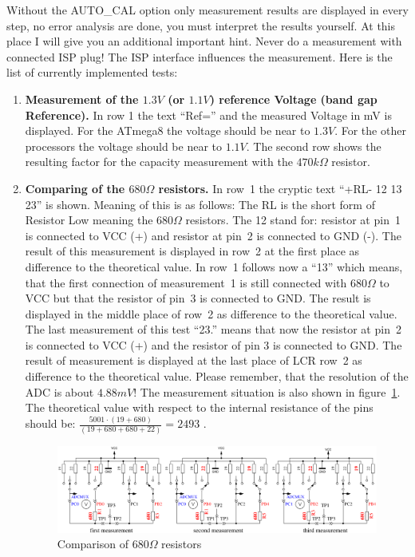 Without the AUTO\_CAL option only measurement results are displayed in every step, no error analysis are done, you must interpret the results yourself.
At this place I will give you an additional important hint. Never do a measurement with connected ISP plug!
The ISP interface influences the measurement. 
\vspace{1cm}
Here is the list of currently implemented tests:
\vspace{1cm}
\begin{enumerate}
\item {\bf Measurement of the \(1.3V\) (or \(1.1V\)) reference Voltage (band gap Reference).}
In row 1 the text ``Ref='' and the measured Voltage in mV is displayed.
For the ATmega8 the voltage should be near to \(1.3V\). For the other processors the voltage should be near to \(1.1V\).
The second row shows the resulting factor for the capacity measurement with the \(470k\Omega\) resistor.
\item {\bf Comparing of the  \(680\Omega\) resistors.}
In row~1 the cryptic text  ``+RL- 12 13 23'' is shown. Meaning of this is as follows: 
The RL is the short form of Resistor Low meaning the \(680\Omega\) resistors. The 12 stand for: 
resistor at pin~1 is connected to VCC (+) and resistor at pin~2 is connected to GND (-). 
The result of this measurement  is displayed in row~2 at the first place as difference to the theoretical value. 
 In row~1 follows now a ``13'' which means, that the first connection of measurement~1 is still connected
with \(680\Omega\) to VCC but that the resistor of pin~3 is connected to GND.
The result is displayed in the middle place of row~2 as difference to the theoretical value. 
The last measurement of this test ``23.'' means that now the resistor at pin~2 is connected to VCC (+) and
the resistor of pin 3 is connected to GND.
The result of measurement is displayed at the last place of LCR row~2 as difference to the theoretical value.
Please remember, that the resolution of the ADC is about \(4.88mV\)!
The measurement situation is also shown in figure~\ref{fig:test2}.
The theoretical value with respect to the internal resistance of the pins should be: 
\(\frac{5001 \cdot  (19+680)}{ (19+680+680+22)} = 2493\) .

\begin{figure}[H]
\centering
\includegraphics[width=17cm]{../FIG/Test2.pdf}
\caption{Comparison of \(680\Omega\) resistors }
\label{fig:test2}
\end{figure}


\end{enumerate}
